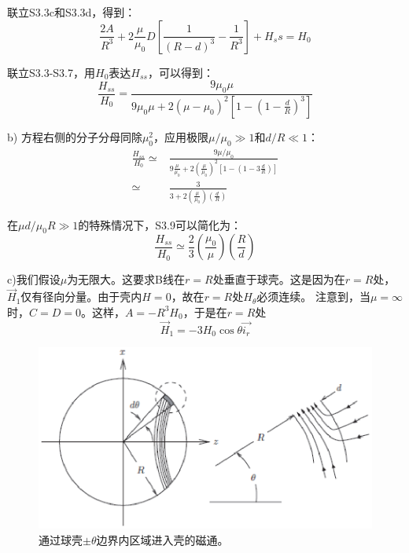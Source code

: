 联立S3.3c和S3.3d，得到：
\begin{equation*}
\frac{2A}{R^3}+2\frac{\mu}{\mu_0}D\left[\frac{1}{(R-d)^3}-\frac{1}{R^3}\right]+H_ss =H_0  \tag{S3.7}
\end{equation*}

联立S3.3-S3.7，用$H_0$表达$H_{ss}$，可以得到：
\begin{equation*}
\frac{H_{ss}}{H_0}=\frac{9\mu_0 \mu}{9\mu_0 \mu+2(\mu-\mu_0)^2\left[1-\left(1-\frac{d}{R}\right)^3\right]}  \tag{2.46}
\end{equation*}

b) 方程右侧的分子分母同除$\mu_0^2$，应用极限$\mu/\mu_0\gg 1$和$d/R\ll 1$：
\begin{align}
\frac{H_{ss}}{H_0}\simeq& \frac{9\mu/\mu_0}{9\frac{\mu}{\mu_0}+2(\frac{\mu}{\mu_0})^2\left[1-(1-3\frac{d}{R})\right]} \nonumber\tag{S3.8}\\
\simeq&\frac{3}{3+2(\frac{\mu}{\mu_0})(\frac{d}{R})}\nonumber \tag{S3.9}
\end{align}

在$\mu d/\mu_0 R \gg 1$的特殊情况下，S3.9可以简化为：
\begin{equation*}
\frac{H_{ss}}{H_0}\simeq \frac{2}{3}(\frac{\mu_0}{\mu})(\frac{R}{d})  \tag{2.47}
\end{equation*}

c)我们假设$\mu$为无限大。这要求B线在$r=R$处垂直于球壳。这是因为在$r=R$处，$\vec{H}_1$仅有径向分量。由于壳内$H=0$，故在$r=R$处$H_\theta$必须连续。
注意到，当$\mu=\infty$时，$C=D=0$。这样，$A=-R^3 H_0$，于是在$r=R$处
\begin{equation*}
\vec{H}_1=-3 H_0 \cos\theta \vec{i_r} \tag{S3.10}
\end{equation*}

\begin{figure}[htbp]
	\centering
	\includegraphics[scale=0.7]{chpt2/figs/fig2.5.eps}
	\caption{通过球壳$\pm \theta$边界内区域进入壳的磁通。}
\end{figure}

